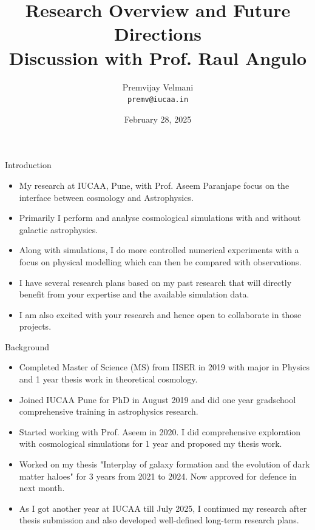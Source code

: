 \documentclass{beamer}
\title[Research Overview]{Research Overview and Future Directions \\ Discussion with Prof. Raul Angulo}
\author[Premvijay Velmani]{Premvijay Velmani \\ \texttt{premv@iucaa.in}}
\institute[IUCAA]{Inter-University Centre for Astronomy and Astrophysics (IUCAA), Pune \\
PhD Supervisor : Prof. Aseem Paranjape}
\date[Interview with Prof Raul Angulo]{February 28, 2025}
\begin{document}
\begin{frame}
    \titlepage
\end{frame}



\begin{frame}{Introduction}
\begin{itemize}
\item My research at IUCAA, Pune, with Prof. Aseem Paranjape focus on the interface between cosmology and Astrophysics.
\item Primarily I perform and analyse cosmological simulations with and without galactic astrophysics.
\item Along with simulations, I do more controlled numerical experiments with a focus on physical modelling which can then be compared with observations.
\item I have several research plans based on my past research that will directly benefit from your expertise and the available simulation data. 
\item I am also excited with your research and hence open to collaborate in those projects.
\end{itemize}
\end{frame}

\begin{frame}{Background}
    \begin{itemize}
        \item Completed Master of Science (MS) from IISER in 2019 with major in Physics and 1 year thesis work in theoretical cosmology.
        \item Joined IUCAA Pune for PhD in August 2019 and did one year gradschool comprehensive training in astrophysics research.
        \item Started working with Prof. Aseem in 2020. I did comprehensive exploration with cosmological simulations for 1 year and proposed my thesis work.
        \item Worked on my thesis "Interplay of galaxy formation and the evolution of dark matter haloes" for 3 years from 2021 to 2024. Now approved for defence in next month.
        \item As I got another year at IUCAA till July 2025, I continued my research after thesis submission and also developed well-defined long-term research plans. 
    \end{itemize}
\end{frame}
\end{document}
